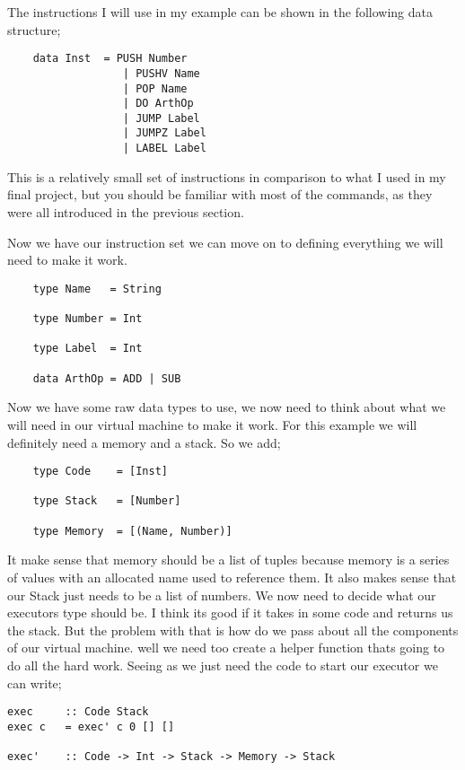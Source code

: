 The instructions I will use in my example can be shown in the following data structure;

\begin{lstlisting}
	data Inst  = PUSH Number
	              | PUSHV Name
	              | POP Name
      		      | DO ArthOp
       		      | JUMP Label
      		      | JUMPZ Label
      		      | LABEL Label
\end{lstlisting} 

This is a relatively small set of instructions in comparison to what I used in my final project, but you should be familiar with most of the commands, as they were all introduced in the previous section. 

Now we have our instruction set we can move on to defining everything we will need to make it work.

\begin{lstlisting}
	type Name   = String
	
	type Number = Int
	
	type Label  = Int
	
	data ArthOp = ADD | SUB 
\end{lstlisting} 

Now we have some raw data types to use, we now need to think about what we will need in our virtual machine to make it work. For this example we will definitely need a memory and a stack. So we add;

\begin{lstlisting}
	type Code    = [Inst]
	
	type Stack   = [Number]
	
	type Memory  = [(Name, Number)]		
\end{lstlisting} 

It make sense that memory should be a list of tuples because memory is a series of values with an allocated name used to reference them. It also makes sense that our Stack just needs to be a list of numbers. We now need to decide what our executors type should be. I think its good if it takes in some code and returns us the stack. But the problem with that is how do we pass about all the components of our virtual machine. well we need too create a helper function thats going to do all the hard work. Seeing as we just need the code to start our executor we can write;

\begin{lstlisting}
exec     :: Code Stack
exec c   = exec' c 0 [] []

exec'    :: Code -> Int -> Stack -> Memory -> Stack	
\end{lstlisting} 

